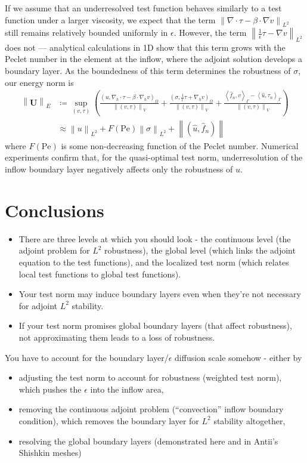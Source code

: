 \documentclass[11pt,onecolumn]{scrartcl}
\newcommand{\nor}[1]{\left\| #1 \right\|}
\newcommand{\LRp}[1]{\left( #1 \right)}
\newcommand{\LRa}[1]{\left\langle #1 \right\rangle}
\newcommand{\Grad} {\ensuremath{\nabla}}
\newcommand{\uh}{\widehat{u}}
\newcommand{\fnh}{\widehat{f}_n}
\newcommand{\grad}{\nabla}
\renewcommand{\div}{\grad \cdot}
\begin{document}
If we assume that an underresolved test function behaves similarly to a test function under a larger viscosity, we expect that the term $\nor{\div \tau - \beta \cdot \grad v}_{L^2}$ still remains relatively bounded uniformly in $\epsilon$. However, the term $\nor{\frac{1}{\epsilon}\tau - \grad v}_{L^2}$ does not --- analytical calculations in 1D show that this term grows with the Peclet number in the element at the inflow, where the adjoint solution develops a boundary layer. As the boundedness of this term determines the robustness of $\sigma$, our energy norm is
\begin{align*}
\nor{\boldsymbol U}_E &\coloneqq \sup_{\LRp{v,\tau}}\LRp{\frac{\LRp{u,\Grad_h \cdot \tau - \beta \cdot \Grad_h v}_{\Omega}}{\nor{\LRp{v,\tau}}_V} + \frac{\LRp{\sigma, \frac{1}{\epsilon}\tau + \Grad_h v}_{\Omega}}{\nor{\LRp{v,\tau}}_V} + \frac{\LRa{\fnh,v}_{\Gamma} - \LRa{\uh,\tau_n}_{\Gamma}}{\nor{\LRp{v,\tau}}_V}} \\
&\approx \nor{u}_{L^2} + F(\text{Pe})\nor{\sigma}_{L^2} + \nor{\LRp{\uh,\fnh}}
\end{align*}
where $F(\text{Pe})$ is some non-decreasing function of the Peclet number. Numerical experiments confirm that, for the quasi-optimal test norm, underresolution of the inflow boundary layer negatively affects only the robustness of $u$. 

\section{Conclusions}

\begin{itemize}
\item There are three levels at which you should look - the continuous level (the adjoint problem for $L^2$ robustness), the global level (which links the adjoint equation to the test functions), and the localized test norm (which relates local test functions to global test functions). 
\item Your test norm may induce boundary layers even when they're not necessary for adjoint $L^2$ stability.
\item If your test norm promises global boundary layers (that affect robustness), not approximating them leads to a loss of robustness. 
\end{itemize}

You have to account for the boundary layer/$\epsilon$ diffusion scale somehow - either by 
\begin{itemize}
\item adjusting the test norm to account for robustness (weighted test norm), which pushes the $\epsilon$ into the inflow area, 
\item removing the continuous adjoint problem (``convection'' inflow boundary condition), which removes the boundary layer for $L^2$ stability altogether, 
\item resolving the global boundary layers (demonstrated here and in Antii's Shishkin meshes)
\end{itemize}
\end{document}
